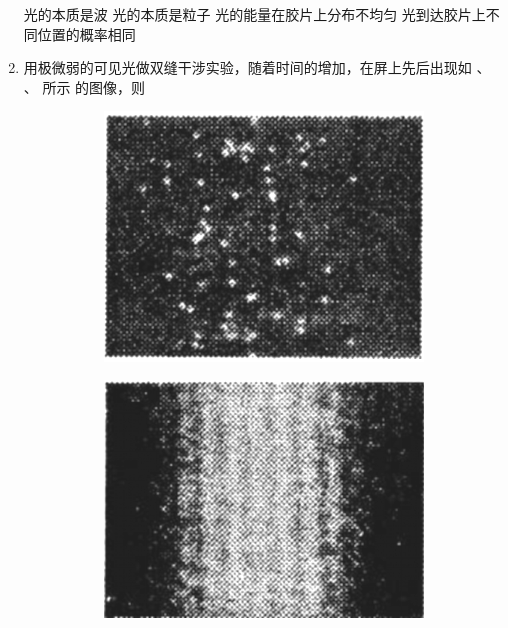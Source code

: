\begin{enumerate}
\fourchoices
{光的本质是波}
{光的本质是粒子}
{光的能量在胶片上分布不均匀}
{光到达胶片上不同位置的概率相同}



\item 
{}
用极微弱的可见光做双缝干涉实验，随着时间的增加，在屏上先后出现如  、 、  所示
的图像，则 
\begin{figure}[h!]
	\centering
	\begin{subfigure}{0.22\linewidth}
		\centering
		\includegraphics[width=0.85\linewidth]{picture/screenshot079}
		\caption{}\label{2011上海双缝干涉a}
	\end{subfigure}
	\begin{subfigure}{0.22\linewidth}
		\centering
		\includegraphics[width=0.85\linewidth]{picture/screenshot080}
		\caption{}\label{2011上海双缝干涉b}

\end{subfigure}
\end{figure}
\end{enumerate}

